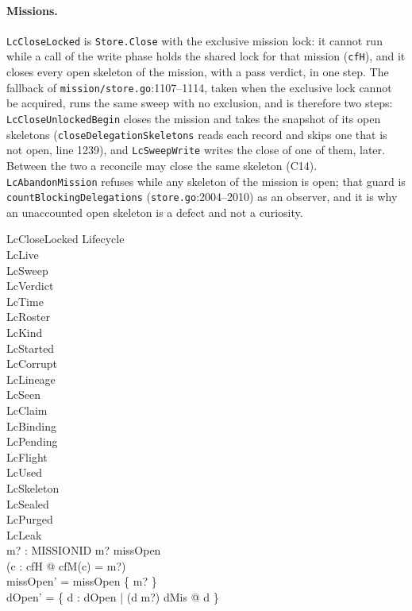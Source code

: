 \documentclass[a4paper,10pt,fleqn]{article}
\newcommand{\fpath}[1]{\texttt{#1}}
\newcommand{\field}[1]{\texttt{#1}}
\begin{document}
\paragraph{Missions.} \field{LcCloseLocked} is \field{Store.Close} with the
exclusive mission lock: it cannot run while a call of the write phase holds
the shared lock for that mission (\field{cfH}), and it closes every open
skeleton of the mission, with a pass verdict, in one step. The fallback of
\fpath{mission/store.go}:1107--1114, taken when the exclusive lock cannot be
acquired, runs the same sweep with no exclusion, and is therefore two steps:
\field{LcCloseUnlockedBegin} closes the mission and takes the snapshot of
its open skeletons (\field{closeDelegationSkeletons} reads each record and
skips one that is not open, line 1239), and \field{LcSweepWrite} writes the
close of one of them, later. Between the two a reconcile may close the same
skeleton (C14). \field{LcAbandonMission}
refuses while any skeleton of the mission is open; that guard is
\field{countBlockingDelegations}
(\fpath{store.go}:2004--2010) as an observer, and it is why an unaccounted
open skeleton is a defect and not a curiosity.

\begin{schema}{LcCloseLocked}
\Delta Lifecycle \\
\Xi LcLive \\
\Xi LcSweep \\
\Xi LcVerdict \\
\Xi LcTime \\
\Xi LcRoster \\
\Xi LcKind \\
\Xi LcStarted \\
\Xi LcCorrupt \\
\Xi LcLineage \\
\Xi LcSeen \\
\Xi LcClaim \\
\Xi LcBinding \\
\Xi LcPending \\
\Xi LcFlight \\
\Xi LcUsed \\
\Xi LcSkeleton \\
\Xi LcSealed \\
\Xi LcPurged \\
\Xi LcLeak \\
m? : MISSIONID
\where
m? \in missOpen \\
\lnot (\exists c : cfH @ cfM(c) = m?) \\
missOpen' = missOpen \setminus \{ m? \} \\
dOpen' = \{ d : dOpen | (d \mapsto m?) \notin dMis @ d \}
\end{schema}
\end{document}
